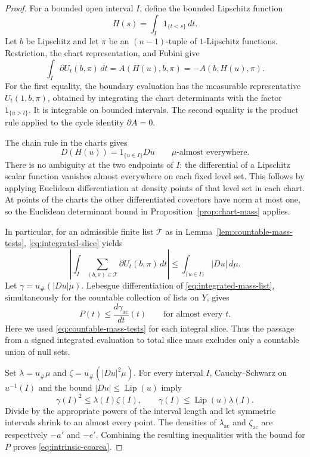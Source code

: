 \documentclass[11pt]{article}
\numberwithin{equation}{section}
\theoremstyle{definition}
\theoremstyle{remark}
\begin{document}
\begin{proof}
For a bounded open interval $I$, define the bounded Lipschitz function
\[
 H(s)=\int_I1_{\{t<s\}}\,d t.
\]
Let $b$ be Lipschitz and let $\pi$ be an $(n-1)$-tuple of
$1$-Lipschitz functions.  Restriction, the chart representation, and
Fubini give
\begin{equation}
 \int_I\partial U_t(b,\pi)\,d t
   =A(H(u),b,\pi)=-A(b,H(u),\pi).
 \label{eq:integrated-slice}
\end{equation}
For the first equality, the boundary evaluation has the measurable
representative $U_t(1,b,\pi)$, obtained by integrating the chart
determinants with the factor $1_{\{u>t\}}$.  It is integrable on bounded
intervals.  The second equality is the product rule applied to the
cycle identity $\partial A=0$.

The chain rule in the charts gives
\[
 D(H(u))=1_{\{u\in I\}}Du\qquad\mu\text{-almost everywhere}.
\]
There is no ambiguity at the two endpoints of $I$: the differential
of a Lipschitz scalar function vanishes almost everywhere on each
fixed level set.  This follows by applying Euclidean differentiation
at density points of that level set in each chart.  At points of the
charts the other differentiated covectors have norm at most one, so
the Euclidean determinant bound in
Proposition~\ref{prop:chart-mass} applies.

In particular, for an admissible finite list $\mathcal T$ as in
Lemma~\ref{lem:countable-mass-tests}, \eqref{eq:integrated-slice} yields
\begin{equation}
 \left|\int_I\sum_{(b,\pi)\in\mathcal T}
                  \partial U_t(b,\pi)\,d t\right|
 \le\int_{\{u\in I\}}|Du|\,d\mu.
 \label{eq:integrated-mass-list}
\end{equation}
Let $\gamma=u_\#(|Du|\mu)$.  Lebesgue differentiation of
\eqref{eq:integrated-mass-list}, simultaneously for the countable
collection of lists on $Y$, gives
\[
 P(t)\le\frac{d\gamma_{\mathrm{ac}}}{dt}(t)
 \qquad\text{for almost every }t.
\]
Here we used \eqref{eq:countable-mass-tests} for each integral slice.
Thus the passage from a signed integrated evaluation to total slice
mass excludes only a countable union of null sets.

Set $\lambda=u_\#\mu$ and $\zeta=u_\#(|Du|^2\mu)$.  For every interval
$I$, Cauchy--Schwarz on $u^{-1}(I)$ and the bound
$|Du|\le\operatorname{Lip}(u)$ imply
\[
 \gamma(I)^2\le\lambda(I)\zeta(I),\qquad
 \gamma(I)\le\operatorname{Lip}(u)\lambda(I).
\]
Divide by the appropriate powers of the interval length and let
symmetric intervals shrink to an almost every point.  The densities
of $\lambda_{\mathrm{ac}}$ and $\zeta_{\mathrm{ac}}$ are respectively
$-a'$ and $-e'$.  Combining the resulting inequalities with the bound
for $P$ proves \eqref{eq:intrinsic-coarea}.
\end{proof}
\end{document}
